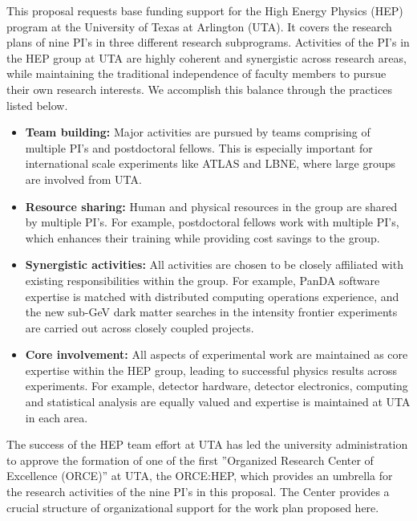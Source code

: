 
This proposal requests base funding support for the High Energy Physics (HEP) program at the University of Texas at Arlington (UTA). It covers the research plans of nine PI's in three different research subprograms. Activities of the PI's in the HEP group at UTA are highly coherent and synergistic across research areas, while maintaining the traditional independence of faculty members to pursue their own research interests. We accomplish this balance through the practices listed below.

\begin{itemize}[noitemsep,nolistsep]

\item \textbf{Team building:} Major activities are pursued by teams comprising of multiple PI's and postdoctoral fellows. This is especially important for international scale experiments like ATLAS and LBNE, where large groups are involved from UTA.

\item \textbf{Resource sharing:} Human and physical resources in the group are shared by multiple PI's. For example, postdoctoral fellows work with multiple PI's, which enhances their training while providing cost savings to the group.

\item \textbf{Synergistic activities:} All activities are chosen to be closely affiliated with existing responsibilities within the group. For example, PanDA software expertise is matched with distributed computing operations experience, and the new sub-GeV dark matter searches in the intensity frontier experiments are carried out across closely coupled projects.

\item \textbf{Core involvement:} All aspects of experimental work are maintained as core expertise within the HEP group, leading to successful physics results across experiments. For example, detector hardware, detector electronics, computing and statistical analysis are equally valued and expertise is maintained at UTA in each area.

\end{itemize}

\noindent The success of the HEP team effort at UTA has led the university administration to approve the formation of one of the first ''Organized Research Center of Excellence (ORCE)'' at UTA, the ORCE:HEP, which provides an umbrella for the research activities of the nine PI's in this proposal. The Center provides a crucial structure of organizational support for the work plan proposed here.

